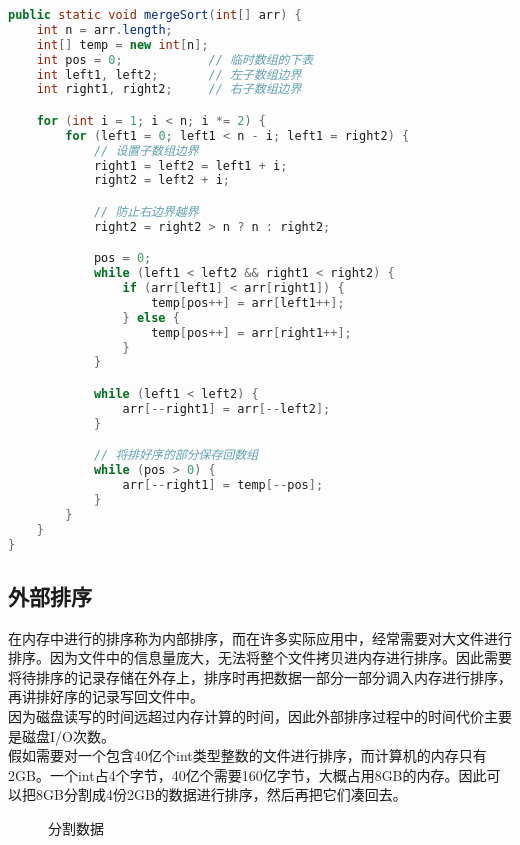 \begin{lstlisting}[language=Java]
public static void mergeSort(int[] arr) {
    int n = arr.length;
    int[] temp = new int[n];
    int pos = 0;            // 临时数组的下表
    int left1, left2;       // 左子数组边界
    int right1, right2;     // 右子数组边界

    for (int i = 1; i < n; i *= 2) {
        for (left1 = 0; left1 < n - i; left1 = right2) {
            // 设置子数组边界
            right1 = left2 = left1 + i;
            right2 = left2 + i;

            // 防止右边界越界
            right2 = right2 > n ? n : right2;

            pos = 0;
            while (left1 < left2 && right1 < right2) {
                if (arr[left1] < arr[right1]) {
                    temp[pos++] = arr[left1++];
                } else {
                    temp[pos++] = arr[right1++];
                }
            }

            while (left1 < left2) {
                arr[--right1] = arr[--left2];
            }

            // 将排好序的部分保存回数组
            while (pos > 0) {
                arr[--right1] = temp[--pos];
            }
        }
    }
}
\end{lstlisting}

\vspace{0.5cm}

\subsection{外部排序}

在内存中进行的排序称为内部排序，而在许多实际应用中，经常需要对大文件进行排序。因为文件中的信息量庞大，无法将整个文件拷贝进内存进行排序。因此需要将待排序的记录存储在外存上，排序时再把数据一部分一部分调入内存进行排序，再讲排好序的记录写回文件中。\\

因为磁盘读写的时间远超过内存计算的时间，因此外部排序过程中的时间代价主要是磁盘I/O次数。\\

假如需要对一个包含40亿个int类型整数的文件进行排序，而计算机的内存只有2GB。一个int占4个字节，40亿个需要160亿字节，大概占用8GB的内存。因此可以把8GB分割成4份2GB的数据进行排序，然后再把它们凑回去。\\

\begin{figure}[H]
	\centering
	\caption{分割数据}
\end{figure}

